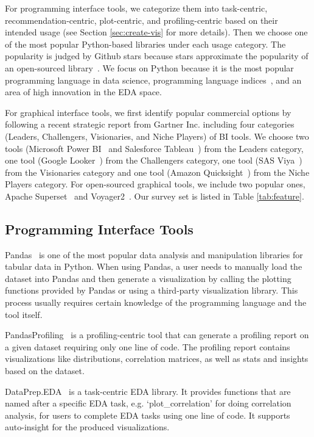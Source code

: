 \documentclass[11pt]{article}
\newcommand{\stitle}[1]{ \noindent{\bf #1.\xspace}}
\begin{document}
For programming interface tools, we categorize them into task-centric, recommendation-centric, plot-centric, and profiling-centric based on their intended usage (see Section \ref{sec:create-vis} for more details). Then we choose one of the most popular Python-based libraries under each usage category. The popularity is judged by Github stars because stars approximate the popularity of an open-sourced library~\cite{DBLP:conf/qrs/PapamichailDS16}. We focus on Python because it is the most popular programming language in data science, programming language indices~\cite{kdnuggets,tiobe}, and an area of high innovation in the EDA space.

For graphical interface tools, we first identify popular commercial options by following a recent strategic report from Gartner Inc. \cite{gartner} including four categories (Leaders, Challengers, Visionaries, and Niche Players) of BI tools. We choose two tools (Microsoft Power BI~\cite{powerbi} and Salesforce Tableau~\cite{tableau}) from the Leaders category, one tool (Google Looker~\cite{looker}) from the Challengers category, one tool (SAS Viya~\cite{viya}) from the Visionaries category and one tool (Amazon Quicksight~\cite{quicksight}) from the Niche Players category. For open-sourced graphical tools, we include two popular ones, Apache Superset~\cite{superset} and Voyager2~\cite{DBLP:conf/chi/WongsuphasawatQ17}. Our survey set is listed in Table \ref{tab:feature}. 

\subsection{Programming Interface Tools}

\stitle{Pandas}
Pandas~\cite{reback2020pandas} is one of the most popular data analysis and manipulation libraries for tabular data in Python. When using Pandas, a user needs to manually load the dataset into Pandas and then generate a visualization by calling the plotting functions provided by Pandas or using a third-party visualization library. This process usually requires certain knowledge of the programming language and the tool itself.

\stitle{PandasProfiling}
PandasProfiling~\cite{pandas-profiling} is a profiling-centric tool that can generate a profiling report on a given dataset requiring only one line of code. The profiling report contains visualizations like distributions, correlation matrices, as well as stats and insights based on the dataset.


\stitle{DataPrep.EDA} 
DataPrep.EDA~\cite{DBLP:conf/sigmod/PengWLBYXCRW21} is a task-centric EDA library. It provides functions that are named after a specific EDA task, e.g. `plot\_correlation' for doing correlation analysis, for users to complete EDA tasks using one line of code. It supports auto-insight for the produced visualizations. 
\end{document}

